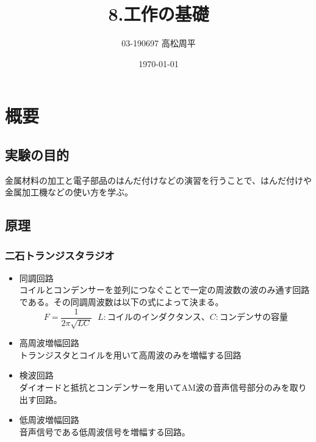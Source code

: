 \documentclass{jsarticle}
\title{8.工作の基礎}
\author{03-190697 高松周平}
\date{\today}
\begin{document}
\maketitle
\section{概要}
\subsection{実験の目的}
金属材料の加工と電子部品のはんだ付けなどの演習を行うことで、はんだ付けや金属加工機などの使い方を学ぶ。
\subsection{原理}
\subsubsection{二石トランジスタラジオ}
\begin{itemize}
\item 同調回路\\
コイルとコンデンサーを並列につなぐことで一定の周波数の波のみ通す回路である。その同調周波数は以下の式によって決まる。\\
$$
F = \frac{1}{2\pi\sqrt{LC}}\ \ \ L:コイルのインダクタンス、C:コンデンサの容量
$$
\item 高周波増幅回路\\
トランジスタとコイルを用いて高周波のみを増幅する回路
\item 検波回路\\
ダイオードと抵抗とコンデンサーを用いてAM波の音声信号部分のみを取り出す回路。
\item 低周波増幅回路\\
音声信号である低周波信号を増幅する回路。
\end{itemize}
\end{document}
